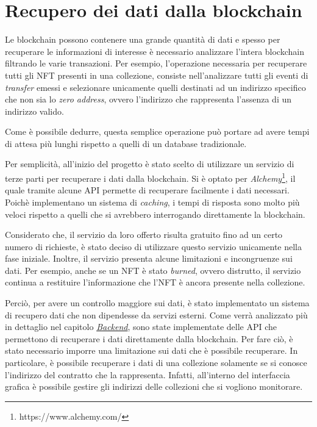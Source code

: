 \section{Recupero dei dati dalla blockchain}
\label{sec:recuperoDatiBlockchain}

Le blockchain possono contenere una grande quantità di dati e spesso per recuperare le informazioni di interesse è necessario analizzare l'intera blockchain filtrando le varie transazioni. Per esempio, l'operazione necessaria per recuperare tutti gli NFT presenti in una collezione, consiste nell'analizzare tutti gli eventi di \textit{transfer} emessi e selezionare unicamente quelli destinati ad un indirizzo specifico che non sia lo \textit{zero address}, ovvero l'indirizzo che rappresenta l'assenza di un indirizzo valido.

Come è possibile dedurre, questa semplice operazione può portare ad avere tempi di attesa più lunghi rispetto a quelli di un database tradizionale. 

Per semplicità, all'inizio del progetto è stato scelto di utilizzare un servizio di terze parti per recuperare i dati dalla blockchain. Si è optato per  \textit{Alchemy}\footnote{https://www.alchemy.com/}, il quale tramite alcune API permette di recuperare facilmente i dati necessari. Poichè implementano un sistema di \textit{caching}, i tempi di risposta sono molto più veloci rispetto a quelli che si avrebbero interrogando direttamente la blockchain.

Considerato che, il servizio da loro offerto risulta gratuito fino ad un certo numero di richieste, è stato deciso di utilizzare questo servizio unicamente nella fase iniziale. Inoltre, il servizio presenta alcune limitazioni e incongruenze sui dati. Per esempio, anche se un NFT è stato \textit{burned}, ovvero distrutto, il servizio continua a restituire l'informazione che l'NFT è ancora presente nella collezione.

Perciò, per avere un controllo maggiore sui dati, è stato implementato un sistema di recupero dati che non dipendesse da servizi esterni. Come verrà analizzato più in dettaglio nel capitolo \hyperref[sec:backend]{\textit{Backend}}, sono state implementate delle API che permettono di recuperare i dati direttamente dalla blockchain. Per fare ciò, è stato necessario imporre una limitazione sui dati che è possibile recuperare. In particolare, è possibile recuperare i dati di una collezione solamente se si conosce l'indirizzo del contratto che la rappresenta. Infatti, all'interno del interfaccia grafica è possibile gestire gli indirizzi delle collezioni che si vogliono monitorare. 

